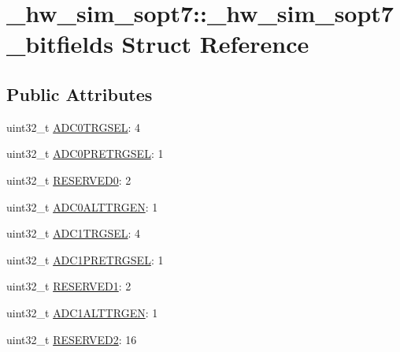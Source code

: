 \hypertarget{struct__hw__sim__sopt7_1_1__hw__sim__sopt7__bitfields}{}\section{\+\_\+hw\+\_\+sim\+\_\+sopt7\+:\+:\+\_\+hw\+\_\+sim\+\_\+sopt7\+\_\+bitfields Struct Reference}
\label{struct__hw__sim__sopt7_1_1__hw__sim__sopt7__bitfields}
\subsection*{Public Attributes}
\begin{DoxyCompactItemize}
\item 
uint32\+\_\+t \hyperlink{struct__hw__sim__sopt7_1_1__hw__sim__sopt7__bitfields_a035107dfb03ecd76ac26b0cfbd447b86}{A\+D\+C0\+T\+R\+G\+S\+EL}\+: 4
\item 
uint32\+\_\+t \hyperlink{struct__hw__sim__sopt7_1_1__hw__sim__sopt7__bitfields_a814ef58edb6d59ed2e9a26e1df2f2599}{A\+D\+C0\+P\+R\+E\+T\+R\+G\+S\+EL}\+: 1
\item 
uint32\+\_\+t \hyperlink{struct__hw__sim__sopt7_1_1__hw__sim__sopt7__bitfields_ae7b94d05c8c270bf3203cd83329b2480}{R\+E\+S\+E\+R\+V\+E\+D0}\+: 2
\item 
uint32\+\_\+t \hyperlink{struct__hw__sim__sopt7_1_1__hw__sim__sopt7__bitfields_ae7e967483c1f6d91e0cb573b243556bd}{A\+D\+C0\+A\+L\+T\+T\+R\+G\+EN}\+: 1
\item 
uint32\+\_\+t \hyperlink{struct__hw__sim__sopt7_1_1__hw__sim__sopt7__bitfields_a87b349c425fe8493e9b6a1c9efef0994}{A\+D\+C1\+T\+R\+G\+S\+EL}\+: 4
\item 
uint32\+\_\+t \hyperlink{struct__hw__sim__sopt7_1_1__hw__sim__sopt7__bitfields_a0ad0ecac66b2a15657d3506ee586b6a8}{A\+D\+C1\+P\+R\+E\+T\+R\+G\+S\+EL}\+: 1
\item 
uint32\+\_\+t \hyperlink{struct__hw__sim__sopt7_1_1__hw__sim__sopt7__bitfields_ad8596a29bbf7f0a895d1c73ea3258908}{R\+E\+S\+E\+R\+V\+E\+D1}\+: 2
\item 
uint32\+\_\+t \hyperlink{struct__hw__sim__sopt7_1_1__hw__sim__sopt7__bitfields_acf569fe7d32c26bf869774b9f14d10b3}{A\+D\+C1\+A\+L\+T\+T\+R\+G\+EN}\+: 1
\item 
uint32\+\_\+t \hyperlink{struct__hw__sim__sopt7_1_1__hw__sim__sopt7__bitfields_ad86c8a285e23a3c2a7bca0f07c1af6f9}{R\+E\+S\+E\+R\+V\+E\+D2}\+: 16
\end{DoxyCompactItemize}


